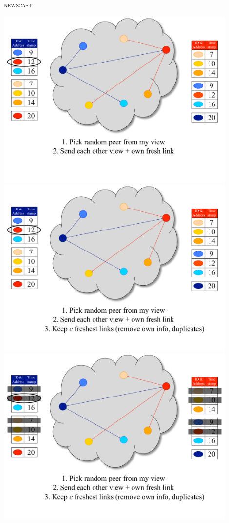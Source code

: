 \begin{frame}{\textsc{newscast}}
\begin{overprint}
\includegraphics[width=0.9\textwidth]{figs/11/7_newscast}
\includegraphics[width=0.9\textwidth]{figs/11/8_newscast}
\includegraphics[width=0.9\textwidth]{figs/11/9_newscast}

\end{overprint}
\end{frame}
